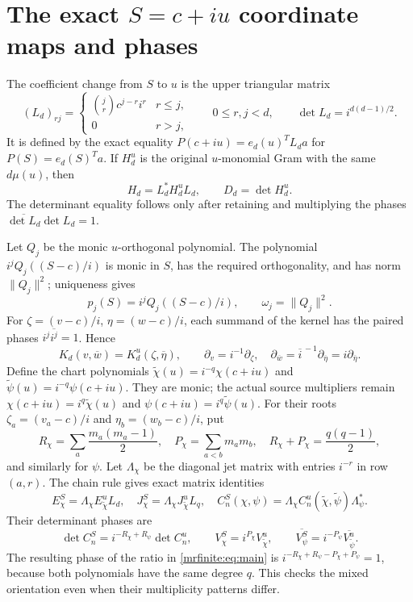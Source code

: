 \documentclass[11pt]{article}
\begin{document}
\section{The exact \(S=c+iu\) coordinate maps and phases}\label{mrfinite:sec:phases}

The coefficient change from \(S\) to \(u\) is the upper triangular
matrix
\[
 (L_d)_{rj}=\begin{cases}\binom jr c^{j-r}i^r&r\leq j,\\0&r>j,
 \end{cases}
 \qquad 0\leq r,j<d,
 \qquad\det L_d=i^{d(d-1)/2}.
\]
It is defined by the exact equality
\(P(c+iu)=e_d(u)^TL_da\) for \(P(S)=e_d(S)^Ta\).
If \(H_d^{u}\) is the original \(u\)-monomial Gram with the same
\(d\mu(u)\), then
\begin{equation}\label{mrfinite:eq:coordinategram}
 H_d=L_d^*H_d^{u}L_d,\qquad D_d=\det H_d^{u}.
\end{equation}
The determinant equality follows only after retaining and multiplying
the phases \(\overline{\det L_d}\det L_d=1\).

Let \(Q_j\) be the monic \(u\)-orthogonal polynomial. The polynomial
\(i^jQ_j((S-c)/i)\) is monic in \(S\), has the required
orthogonality, and has norm \(\|Q_j\|^2\); uniqueness gives
\[
 p_j(S)=i^jQ_j((S-c)/i),\qquad \omega_j=\|Q_j\|^2.
\]
For \(\zeta=(v-c)/i\), \(\eta=(w-c)/i\), each summand of the kernel
has the paired phases \(i^j\overline{i^j}=1\). Hence
\[
 K_d(v,\overline w)=K_d^u(\zeta,\overline\eta),\qquad
 \partial_v=i^{-1}\partial_\zeta,\quad
 \partial_{\overline w}=\overline{i}^{\,-1}\partial_{\overline\eta}
                         =i\partial_{\overline\eta}.
\]
Define the chart polynomials
\(\widetilde\chi(u)=i^{-q}\chi(c+iu)\) and
\(\widetilde\psi(u)=i^{-q}\psi(c+iu)\). They are monic; the actual
source multipliers remain
\(\chi(c+iu)=i^q\widetilde\chi(u)\) and
\(\psi(c+iu)=i^q\widetilde\psi(u)\).
For their roots \(\zeta_a=(v_a-c)/i\) and
\(\eta_b=(w_b-c)/i\), put
\[
 R_\chi=\sum_a\frac{m_a(m_a-1)}2,\quad
 P_\chi=\sum_{a<b}m_am_b,\quad
 R_\chi+P_\chi=\frac{q(q-1)}2,
\]
and similarly for \(\psi\). Let \(\Lambda_\chi\) be the diagonal
jet matrix with entries \(i^{-r}\) in row \((a,r)\).
The chain rule gives exact matrix identities
\begin{equation}\label{mrfinite:eq:jetphases}
 E_\chi^S=\Lambda_\chi E_{\widetilde\chi}^{u}L_d,
 \quad J_\chi^S=\Lambda_\chi J_{\widetilde\chi}^{u}L_q,
 \quad C_n^S(\chi,\psi)
       =\Lambda_\chi C_n^u(\widetilde\chi,\widetilde\psi)
                          \Lambda_\psi^*.
\end{equation}
Their determinant phases are
\[
 \det C_n^S=i^{-R_\chi+R_\psi}\det C_n^u,\qquad
 V_\chi^S=i^{P_\chi}V_{\widetilde\chi}^{u},\qquad
 \overline{V_\psi^S}=i^{-P_\psi}\overline{V_{\widetilde\psi}^{u}}.
\]
The resulting phase of the ratio in \eqref{mrfinite:eq:main} is
\(i^{-R_\chi+R_\psi-P_\chi+P_\psi}=1\), because both polynomials
have the same degree \(q\). This checks the mixed orientation even
when their multiplicity patterns differ.
\end{document}

